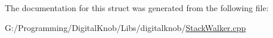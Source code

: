 The documentation for this struct was generated from the following file\-:\begin{DoxyCompactItemize}
\item 
G\-:/\-Programming/\-Digital\-Knob/\-Libs/digitalknob/\hyperlink{_stack_walker_8cpp}{Stack\-Walker.\-cpp}\end{DoxyCompactItemize}
